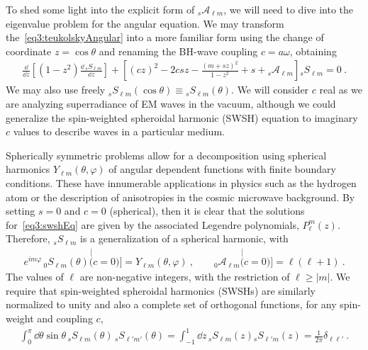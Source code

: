 To shed some light into the explicit form of ${}_{s}\mathscr{A}_{\ell m}$, we will need to dive into the eigenvalue problem for the angular equation. We may transform the~\eqref{eq3:teukolskyAngular} into a more familiar form using the change of coordinate $z=\cos\theta$ and renaming the BH-wave coupling $c=a \omega$, obtaining
\begin{align}
    \frac{\dd}{\dd z} \left[ (1-z^2) \frac{\dd\, {}_{s}S_{\ell m}}{\dd z} \right] + \left[ (c z)^2 - 2 c s z  -\frac{(m + s z)^2}{1 - z^2} + s  + {}_{s}\mathscr{A}_{\ell m} \right] {}_{s}S_{\ell m} = 0 ~.
    \label{eq3:swshEq}
\end{align}
We may also use freely ${}_{s}S_{\ell m}(\cos\theta) \equiv {}_{s}S_{\ell m}(\theta)$.
We will consider $c$ real as we are analyzing superradiance of EM waves in the vacuum, although we could generalize the spin-weighted spheroidal harmonic (SWSH) equation to imaginary $c$ values to describe waves in a particular medium.

Spherically symmetric problems allow for a decomposition using spherical harmonics $Y_{\ell m}(\theta,\varphi)$ of angular dependent functions with finite boundary conditions.
These have innumerable applications in physics such as the hydrogen atom or the description of anisotropies in the cosmic microwave background.
By setting $s=0$ and $c=0$ (spherical), then it is clear that the solutions for~\eqref{eq3:swshEq} are given by the associated Legendre polynomials, $P^m_\ell(z)$. Therefore, ${}_{s}S_{\ell m}$ is a generalization of a spherical harmonic, with
\begin{align}
    e^{i m \varphi} \,{}_{0}S_{\ell m}(\theta) \stackrel[(c=0)]{}{=} Y_{\ell m}(\theta,\varphi) ~,\qquad {}_{0}\mathscr{A}_{\ell m} \stackrel[(c=0)]{}{=} \ell (\ell + 1) ~.
\end{align}
The values of $\ell$ are non-negative integers, with the restriction of $\ell \ge |m|$. 
We require that spin-weighted spheroidal harmonics (SWSHs) are similarly normalized to unity and also a complete set of orthogonal functions, for any spin-weight and coupling $c$,
\begin{align}
    \int_{0}^\pi \dd\theta \sin\theta \,{}_{s}S_{\ell m}(\theta) \,{}_{s}S_{\ell' m'}(\theta)  =
    \int_{-1}^{1} \dd z \,{}_{s}S_{\ell m}(z) {}_{s}S_{\ell' m}(z) = \frac{1}{2\pi} \delta_{\ell \ell'} ~.
\end{align}

